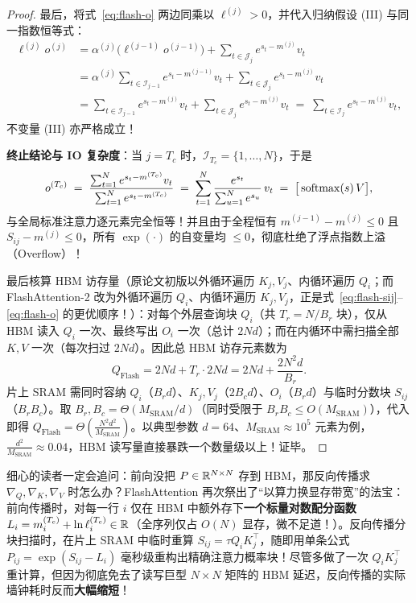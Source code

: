\begin{proof}
最后，将式~\eqref{eq:flash-o} 两边同乘以 $\ell^{(j)} > 0$，并代入归纳假设 (III) 与同一指数恒等式：
\begin{align*}
  \ell^{(j)} o^{(j)}
  &= \alpha^{(j)} \Big(\ell^{(j-1)} o^{(j-1)}\Big) + \sum_{t \in \mathcal{J}_j} e^{s_t - m^{(j)}} v_t \\
  &= \alpha^{(j)} \sum_{t \in \mathcal{I}_{j-1}} e^{s_t - m^{(j-1)}} v_t + \sum_{t \in \mathcal{J}_j} e^{s_t - m^{(j)}} v_t \\
  &= \sum_{t \in \mathcal{I}_{j-1}} e^{s_t - m^{(j)}} v_t + \sum_{t \in \mathcal{J}_j} e^{s_t - m^{(j)}} v_t
  \;=\; \sum_{t \in \mathcal{I}_j} e^{s_t - m^{(j)}} v_t,
\end{align*}
不变量 (III) 亦严格成立！

\textbf{终止结论与 IO 复杂度}：当 $j = T_c$ 时，$\mathcal{I}_{T_c} = \{1, \dots, N\}$，于是
\[
  o^{(T_c)} \;=\; \frac{\sum_{t=1}^{N} e^{s_t - m^{(T_c)}} v_t}{\sum_{t=1}^{N} e^{s_t - m^{(T_c)}}}
  \;=\; \sum_{t=1}^{N} \frac{e^{s_t}}{\sum_{u=1}^{N} e^{s_u}}\, v_t
  \;=\; \big[\operatorname{softmax}(s)\, V\big],
\]
与全局标准注意力逐元素完全恒等！并且由于全程恒有 $m^{(j-1)} - m^{(j)} \le 0$ 且 $S_{ij} - m^{(j)} \le 0$，所有 $\exp(\cdot)$ 的自变量均 $\le 0$，彻底杜绝了浮点指数上溢（Overflow）！

最后核算 HBM 访存量（原论文初版以外循环遍历 $K_j, V_j$、内循环遍历 $Q_i$；而 FlashAttention-2 改为外循环遍历 $Q_i$、内循环遍历 $K_j, V_j$，正是式~\eqref{eq:flash-sij}--\eqref{eq:flash-o} 的更优顺序！）：对每个外层查询块 $Q_i$（共 $T_r = N / B_r$ 块），仅从 HBM 读入 $Q_i$ 一次、最终写出 $O_i$ 一次（总计 $2Nd$）；而在内循环中需扫描全部 $K, V$ 一次（每次扫过 $2Nd$）。因此总 HBM 访存元素数为
\[
  Q_{\mathrm{Flash}} = 2 N d + T_r \cdot 2 N d = 2 N d + \frac{2 N^2 d}{B_r}.
\]
片上 SRAM 需同时容纳 $Q_i$（$B_r d$）、$K_j, V_j$（$2 B_c d$）、$O_i$（$B_r d$）与临时分数块 $S_{ij}$（$B_r B_c$）。取 $B_r, B_c = \Theta(M_{\mathrm{SRAM}} / d)$（同时受限于 $B_r B_c \le O(M_{\mathrm{SRAM}})$），代入即得 $Q_{\mathrm{Flash}} = \Theta\!\left(\frac{N^2 d^2}{M_{\mathrm{SRAM}}}\right)$。以典型参数 $d = 64$、$M_{\mathrm{SRAM}} \approx 10^5$ 元素为例，$\frac{d^2}{M_{\mathrm{SRAM}}} \approx 0.04$，HBM 读写量直接暴跌一个数量级以上！证毕。
\end{proof}

\begin{remark}[反向传播如何同样避免保存 $O(N^2)$ 矩阵？]
细心的读者一定会追问：前向没把 $P \in \mathbb{R}^{N\times N}$ 存到 HBM，那反向传播求 $\nabla_Q, \nabla_K, \nabla_V$ 时怎么办？FlashAttention 再次祭出了“以算力换显存带宽”的法宝：前向传播时，对每一行 $i$ 仅在 HBM 中额外存下\textbf{一个标量对数配分函数} $L_i = m_i^{(T_c)} + \ln \ell_i^{(T_c)} \in \mathbb{R}$（全序列仅占 $O(N)$ 显存，微不足道！）。反向传播分块扫描时，在片上 SRAM 中临时重算 $S_{ij} = \tau Q_i K_j^\top$，随即用单条公式 $P_{ij} = \exp(S_{ij} - L_i)$ 毫秒级重构出精确注意力概率块！尽管多做了一次 $Q_i K_j^\top$ 重计算，但因为彻底免去了读写巨型 $N\times N$ 矩阵的 HBM 延迟，反向传播的实际墙钟耗时反而\textbf{大幅缩短}！
\end{remark}

